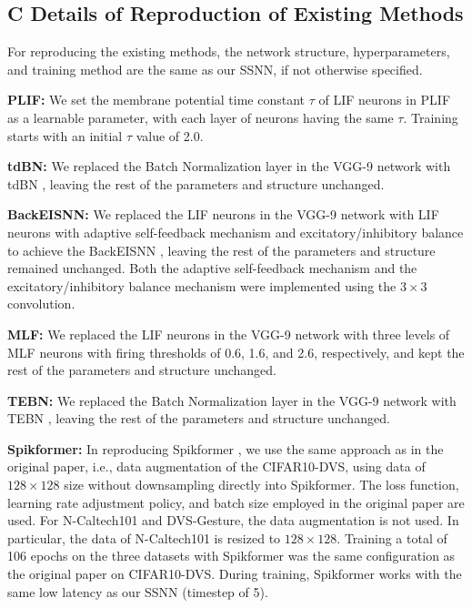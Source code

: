 \documentclass[letterpaper]{article} %
\begin{document}
\subsection{C Details of Reproduction of Existing Methods}
For reproducing the existing methods, the network structure, hyperparameters, and training method are the same as our SSNN, if not otherwise specified.

\textbf{PLIF:} We set the membrane potential time constant $\tau$ of LIF neurons in PLIF \cite{PLIF} as a learnable parameter, with each layer of neurons having the same $\tau$. Training starts with an initial $\tau$ value of 2.0.

\textbf{tdBN:} We replaced the Batch Normalization layer in the VGG-9 network with tdBN \cite{tdBN_2021}, leaving the rest of the parameters and structure unchanged.

\textbf{BackEISNN:} We replaced the LIF neurons in the VGG-9 network with LIF neurons with adaptive self-feedback mechanism and excitatory/inhibitory balance to achieve the BackEISNN \cite{BackEISNN}, leaving the rest of the parameters and structure remained unchanged. Both the adaptive self-feedback mechanism and the excitatory/inhibitory balance mechanism were implemented using the $3 \times 3$ convolution.

\textbf{MLF:} We replaced the LIF neurons in the VGG-9 network with three levels of MLF \cite{MLF} neurons with firing thresholds of 0.6, 1.6, and 2.6, respectively, and kept the rest of the parameters and structure unchanged.

\textbf{TEBN:} We replaced the Batch Normalization layer in the VGG-9 network with TEBN \cite{TEBN}, leaving the rest of the parameters and structure unchanged.

\textbf{Spikformer:} In reproducing Spikformer \cite{Spikformer}, we use the same approach as in the original paper, i.e., data augmentation of the CIFAR10-DVS, using data of $128 \times 128$ size without downsampling directly into Spikformer. The loss function, learning rate adjustment policy, and batch size employed in the original paper are used. For N-Caltech101 and DVS-Gesture, the data augmentation is not used. In particular, the data of N-Caltech101 is resized to $128 \times 128$. Training a total of 106 epochs on the three datasets with Spikformer was the same configuration as the original paper on  CIFAR10-DVS. During training, Spikformer works with the same low latency as our SSNN (timestep of 5).
\end{document}
